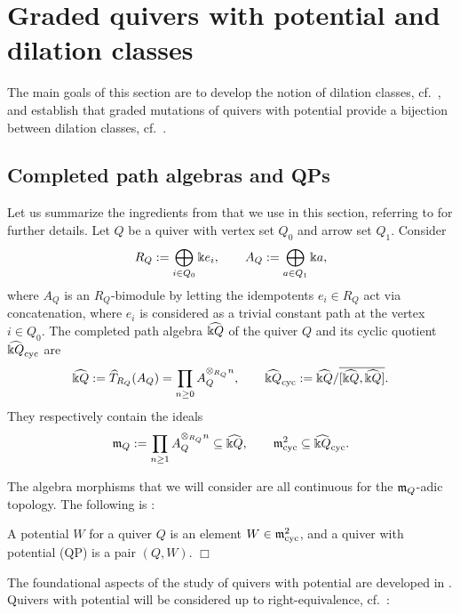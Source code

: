 
\section{Graded quivers with potential and dilation classes}\label{sec:graded-QP}

The main goals of this section are to develop the notion of dilation classes, cf.~, and establish that graded mutations of quivers with potential provide a bijection between dilation classes, cf.~.

\subsection{Completed path algebras and QPs}\label{ssec:prelim_pathalgebras_and_QPs}

Let us summarize the ingredients from \cite{DWZ} that we use in this section, referring to \cite{DWZ} for further details. Let $Q$ be a quiver with vertex set $Q_0$ and arrow set $Q_1$. Consider
\[
  R_Q:=\bigoplus_{i\in Q_0}\Bbbk e_i,
  \qquad
  A_Q:=\bigoplus_{a\in Q_1}\Bbbk a,
\]
where $A_Q$ is an $R_Q$-bimodule by letting the idempotents $e_i\in R_Q$ act via concatenation, where $e_i$ is considered as a trivial constant path at the vertex $i\in Q_0$.  The completed path algebra $\widehat{\Bbbk Q}$ of the quiver $Q$ and its cyclic quotient $\widehat{\Bbbk Q}_{\mathrm{cyc}}$ are
\[
  \widehat{\Bbbk Q}:=\widehat T_{R_Q}(A_Q)
  =\prod_{n\ge 0}A_Q^{\otimes_{R_Q}n},\qquad
  \widehat{\Bbbk Q}_{\mathrm{cyc}}
  :=\widehat{\Bbbk Q}/\overline{[\widehat{\Bbbk Q},\widehat{\Bbbk Q}]}.
\]
They respectively contain the ideals
\[
  \mathfrak m_Q:=\prod_{n\ge1}A_Q^{\otimes_{R_Q}n}\subseteq \widehat{\Bbbk Q},\qquad \mathfrak m^2_{\mathrm{cyc}}\subseteq \widehat{\Bbbk Q}_{\mathrm{cyc}}.
\]

\noindent The algebra morphisms that we will consider are all continuous for the \(\mathfrak m_Q\)-adic topology. The following is \cite[Definition 4.1]{DWZ}:

\begin{definition}
A potential $W$ for a quiver $Q$ is an element $W\in\mathfrak m^2_{\mathrm{cyc}}$, and a quiver with potential (QP) is a pair $(Q,W)$.
\hfill$\Box$\end{definition}

\noindent The foundational aspects of the study of quivers with potential are developed in \cite{DWZ}. Quivers with potential will be considered up to right-equivalence, cf.~\cite[Definition 4.2]{DWZ}:

